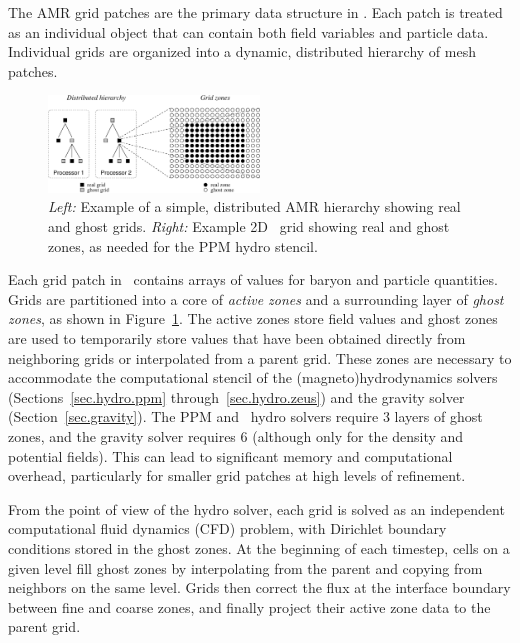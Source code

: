 The AMR grid patches are the primary data structure in \enzo.  Each patch is treated as an individual object that can contain both field variables and particle data.  Individual grids are organized into a  dynamic, distributed hierarchy of mesh patches.  

\begin{figure}
\begin{center}
\includegraphics[width=0.5\textwidth]{figures/amr_hierarchy.eps}
\end{center}
\caption{\emph{Left:} Example of a simple, distributed AMR hierarchy
showing real and ghost grids.  \emph{Right:} Example 2D \enzo\ grid
showing real and ghost zones, as needed for the PPM hydro stencil. }
\label{fig.amr_hierarchy}
\end{figure}

Each grid patch in \enzo\ contains arrays of values for baryon and particle quantities.   Grids are partitioned into a core of \emph{active zones} and a surrounding layer of \emph{ghost zones}, as shown in Figure~\ref{fig.amr_hierarchy}.  The active zones store field values and ghost zones are used to temporarily store values that have been obtained directly from neighboring grids or interpolated from a parent grid.  These zones are necessary to accommodate the computational stencil of the (magneto)hydrodynamics solvers (Sections~\ref{sec.hydro.ppm} through~\ref{sec.hydro.zeus}) and the gravity solver (Section~\ref{sec.gravity}).  The PPM and \zeus\ hydro solvers require 3 layers of ghost zones,  and the gravity solver requires 6 (although only for the density and potential fields).  This can lead to significant memory and computational overhead, particularly for smaller grid patches at high levels of refinement.  

From the point of view of the hydro solver, each grid is solved as an independent computational fluid dynamics (CFD) problem, with Dirichlet boundary conditions stored in the ghost zones.  At the beginning of each timestep, cells on a given level fill ghost zones by interpolating from the parent and copying from neighbors on the same level.  Grids then correct the flux at the interface boundary between fine and coarse zones, and finally project their active zone data to the parent grid. 



